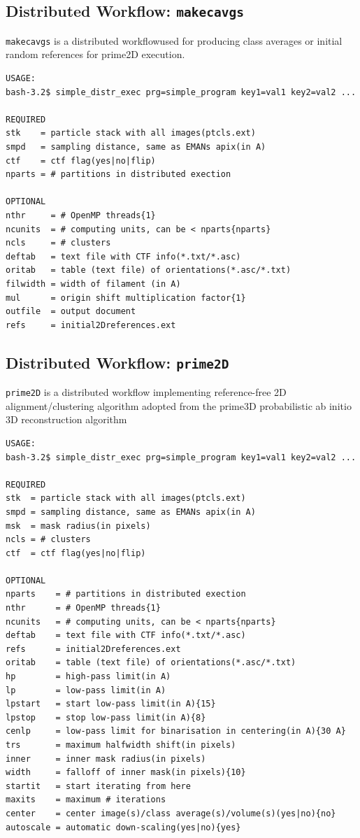 \documentclass[a4paper,11pt]{article}
\newcommand{\prgname}[1]{\textcolor{NavyBlue}{\texttt{#1}}}
\begin{document}
\subsection{Distributed Workflow: \prgname{makecavgs}}
\label{makecavgs}
\prgname{makecavgs} is a distributed workflowused for producing class averages or initial random references for prime2D execution. 

\begin{verbatim}
USAGE:
bash-3.2$ simple_distr_exec prg=simple_program key1=val1 key2=val2 ...

REQUIRED
stk    = particle stack with all images(ptcls.ext)
smpd   = sampling distance, same as EMANs apix(in A)
ctf    = ctf flag(yes|no|flip)
nparts = # partitions in distributed exection

OPTIONAL
nthr     = # OpenMP threads{1}
ncunits  = # computing units, can be < nparts{nparts}
ncls     = # clusters
deftab   = text file with CTF info(*.txt/*.asc)
oritab   = table (text file) of orientations(*.asc/*.txt)
filwidth = width of filament (in A)
mul      = origin shift multiplication factor{1}
outfile  = output document
refs     = initial2Dreferences.ext
\end{verbatim}

\subsection{Distributed Workflow: \prgname{prime2D}}
\label{prime2D}
\prgname{prime2D} is a distributed workflow implementing reference-free 2D alignment/clustering algorithm adopted from the prime3D probabilistic ab initio 3D reconstruction algorithm

\begin{verbatim}
USAGE:
bash-3.2$ simple_distr_exec prg=simple_program key1=val1 key2=val2 ...

REQUIRED
stk  = particle stack with all images(ptcls.ext)
smpd = sampling distance, same as EMANs apix(in A)
msk  = mask radius(in pixels)
ncls = # clusters
ctf  = ctf flag(yes|no|flip)

OPTIONAL
nparts    = # partitions in distributed exection
nthr      = # OpenMP threads{1}
ncunits   = # computing units, can be < nparts{nparts}
deftab    = text file with CTF info(*.txt/*.asc)
refs      = initial2Dreferences.ext
oritab    = table (text file) of orientations(*.asc/*.txt)
hp        = high-pass limit(in A)
lp        = low-pass limit(in A)
lpstart   = start low-pass limit(in A){15}
lpstop    = stop low-pass limit(in A){8}
cenlp     = low-pass limit for binarisation in centering(in A){30 A}
trs       = maximum halfwidth shift(in pixels)
inner     = inner mask radius(in pixels)
width     = falloff of inner mask(in pixels){10}
startit   = start iterating from here
maxits    = maximum # iterations
center    = center image(s)/class average(s)/volume(s)(yes|no){no}
autoscale = automatic down-scaling(yes|no){yes}
\end{verbatim}
\end{document}
